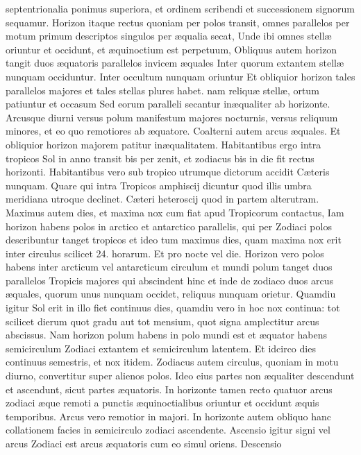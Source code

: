 \documentclass[11pt,a4paper]{article}
\begin{document}
septentrionalia ponimus superiora, et ordinem scribendi et successionem signorum sequamur. Horizon itaque rectus quoniam per polos transit, omnes parallelos per motum primum descriptos singulos per æqualia secat, Unde ibi omnes stellæ oriuntur et occidunt, et æquinoctium est perpetuum, Obliquus autem horizon tangit duos æquatoris parallelos invicem æquales Inter quorum extantem stellæ nunquam occiduntur. Inter occultum nunquam oriuntur Et obliquior horizon tales parallelos majores et tales stellas plures habet. nam reliquæ stellæ, ortum patiuntur et occasum Sed eorum paralleli secantur inæqualiter ab horizonte. Arcusque diurni versus polum manifestum majores nocturnis, versus reliquum minores, et eo quo remotiores ab æquatore. Coalterni autem arcus æquales. Et obliquior horizon majorem patitur inæqualitatem. Habitantibus ergo intra tropicos Sol in anno transit bis per zenit, et zodiacus bis in die fit rectus horizonti. Habitantibus vero sub tropico utrumque dictorum accidit Cæteris nunquam. Quare qui intra Tropicos amphiscij dicuntur quod illis umbra meridiana utroque declinet. Cæteri heteroscij quod in partem alterutram. Maximus autem dies, et maxima nox cum fiat apud Tropicorum contactus, Iam horizon habens polos in arctico et antarctico parallelis, qui per Zodiaci polos describuntur tanget tropicos et ideo tum maximus dies, quam maxima nox erit inter circulus scilicet 24. horarum. Et  pro nocte vel die.
Horizon vero polos habens inter arcticum vel antarcticum circulum et mundi polum tanget duos parallelos Tropicis majores qui abscindent hinc et inde de zodiaco duos arcus æquales, quorum unus nunquam occidet, reliquus nunquam orietur. Quamdiu igitur Sol erit in illo fiet continuus dies, quamdiu vero in hoc nox continua: tot scilicet dierum quot gradu aut tot mensium, quot signa amplectitur arcus abscissus.
Nam horizon polum habens in polo mundi est et æquator habens semicirculum Zodiaci extantem et semicirculum latentem. Et idcirco dies continuus semestris, et nox itidem. Zodiacus autem circulus, quoniam in motu diurno, convertitur super alienos polos. Ideo eius partes non æqualiter descendunt et ascendunt, sicut partes æquatoris. In horizonte tamen recto quatuor arcus zodiaci æque remoti a punctis æquinoctialibus oriuntur et occidunt æquis temporibus. Arcus vero remotior in majori. In horizonte autem obliquo hanc collationem facies in semicirculo zodiaci ascendente. Ascensio igitur signi vel arcus Zodiaci est arcus æquatoris cum eo simul oriens. Descensio
\end{document}
